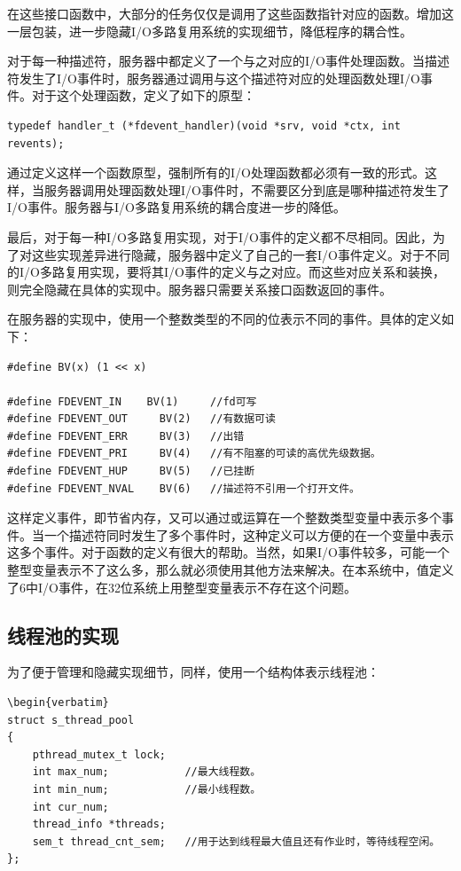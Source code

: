\documentclass[12pt, twoside, a4paper, xetex]{report}
\begin{document}
	在这些接口函数中，大部分的任务仅仅是调用了这些函数指针对应的函数。增加这一层包装，进一步隐藏I/O多路复用系统的实现细节，降低程序的耦合性。

	对于每一种描述符，服务器中都定义了一个与之对应的I/O事件处理函数。当描述符发生了I/O事件时，服务器通过调用与这个描述符对应的处理函数处理I/O事件。对于这个处理函数，定义了如下的原型：
	
\begin{verbatim}	
typedef handler_t (*fdevent_handler)(void *srv, void *ctx, int revents);
\end{verbatim}
	
	通过定义这样一个函数原型，强制所有的I/O处理函数都必须有一致的形式。这样，当服务器调用处理函数处理I/O事件时，不需要区分到底是哪种描述符发生了I/O事件。服务器与I/O多路复用系统的耦合度进一步的降低。
	
	最后，对于每一种I/O多路复用实现，对于I/O事件的定义都不尽相同。因此，为了对这些实现差异进行隐藏，服务器中定义了自己的一套I/O事件定义。对于不同的I/O多路复用实现，要将其I/O事件的定义与之对应。而这些对应关系和装换，则完全隐藏在具体的实现中。服务器只需要关系接口函数返回的事件。
	
	在服务器的实现中，使用一个整数类型的不同的位表示不同的事件。具体的定义如下：
\begin{verbatim}	
#define BV(x) (1 << x)

#define FDEVENT_IN	  BV(1) 	//fd可写
#define FDEVENT_OUT 	BV(2) 	//有数据可读
#define FDEVENT_ERR 	BV(3) 	//出错
#define FDEVENT_PRI 	BV(4) 	//有不阻塞的可读的高优先级数据。
#define FDEVENT_HUP 	BV(5) 	//已挂断
#define FDEVENT_NVAL	BV(6) 	//描述符不引用一个打开文件。
\end{verbatim}
	
	这样定义事件，即节省内存，又可以通过或运算在一个整数类型变量中表示多个事件。当一个描述符同时发生了多个事件时，这种定义可以方便的在一个变量中表示这多个事件。对于函数的定义有很大的帮助。当然，如果I/O事件较多，可能一个整型变量表示不了这么多，那么就必须使用其他方法来解决。在本系统中，值定义了6中I/O事件，在32位系统上用整型变量表示不存在这个问题。
	
\subsection{线程池的实现}
	为了便于管理和隐藏实现细节，同样，使用一个结构体表示线程池：
\begin{verbatim}
\begin{verbatim}
struct s_thread_pool
{
	pthread_mutex_t lock; 
	int max_num;            //最大线程数。
	int min_num;            //最小线程数。
	int cur_num; 
	thread_info *threads;
	sem_t thread_cnt_sem;   //用于达到线程最大值且还有作业时，等待线程空闲。
};
\end{verbatim}
	
\end{document}
